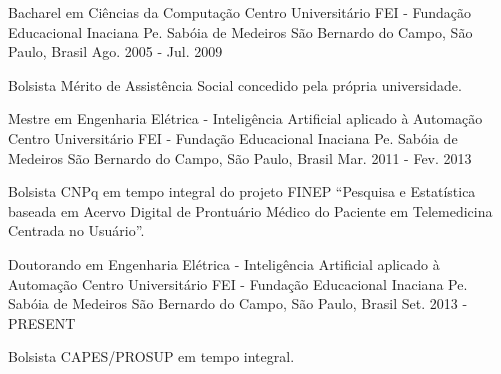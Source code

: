 

\begin{cventries}

  \cventry
    {Bacharel em Ciências da Computação} %
    {Centro Universitário FEI - Fundação Educacional Inaciana Pe. Sabóia de Medeiros} %
    {São Bernardo do Campo, São Paulo, Brasil} %
    {Ago. 2005 - Jul. 2009} %
    {
        \begin{cvitems} %
          \item {Bolsista Mérito de Assistência Social concedido pela própria universidade.}
        \end{cvitems}
    }

  \cventry
    {Mestre em Engenharia Elétrica - Inteligência Artificial aplicado à Automação}
    {Centro Universitário FEI - Fundação Educacional Inaciana Pe. Sabóia de Medeiros} %
    {São Bernardo do Campo, São Paulo, Brasil} %
    {Mar. 2011 - Fev. 2013}
    {
      \begin{cvitems} %
        \item {Bolsista CNPq em tempo integral do projeto FINEP ``Pesquisa e Estatística baseada em Acervo Digital de Prontuário Médico do Paciente em Telemedicina Centrada no Usuário''.}
      \end{cvitems}
    }

  \cventry
    {Doutorando em Engenharia Elétrica - Inteligência Artificial aplicado à Automação}
    {Centro Universitário FEI - Fundação Educacional Inaciana Pe. Sabóia de Medeiros} %
    {São Bernardo do Campo, São Paulo, Brasil} %
    {Set. 2013 - PRESENT}
    {
      \begin{cvitems} %
        \item {Bolsista CAPES/PROSUP em tempo integral.}
      \end{cvitems}
    }

\end{cventries}
